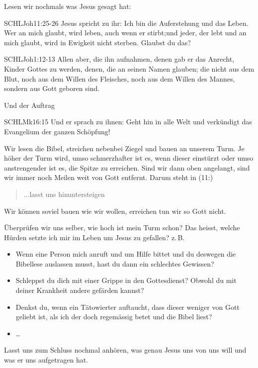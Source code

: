 \documentclass[14pt]{../../inc/mybib}
\newcommand{\q}[1]{\blockquote{#1}}
\newenvironment{block}[1][]{%
  \vspace{1.5em}%
  \noindent\textbf{#1}\par%
  \vspace{0.0em}%
}{%
  \vspace{1em}%
}
\begin{document}
\begin{block}
    Lesen wir nochmals was Jesus gesagt hat:
    \begin{bibelbox}{SCHL}{Joh}{11:25-26}
        Jesus spricht zu ihr: Ich bin die Auferstehung und das Leben. Wer an mich glaubt, wird leben, auch wenn er stirbt;und jeder, der lebt und an mich glaubt, wird in Ewigkeit nicht sterben. Glaubst du das?
    \end{bibelbox} 
    \begin{bibelbox}{SCHL}{Joh}{1:12-13}
        Allen aber, die ihn aufnahmen, denen gab er das Anrecht, Kinder Gottes zu werden, denen, die an seinen Namen glauben;
        die nicht aus dem Blut, noch aus dem Willen des Fleisches, noch aus dem Willen des Mannes, sondern aus Gott geboren sind.
    \end{bibelbox}     
    Und der Auftrag
    \begin{bibelbox}{SCHL}{Mk}{16:15}
        Und er sprach zu ihnen: Geht hin in alle Welt und verkündigt das Evangelium der ganzen Schöpfung!
    \end{bibelbox} 
    Wir lesen die Bibel, streichen nebenbei Ziegel und bauen an unserem Turm. Je höher der Turm wird, umso schmerzhafter ist es, wenn dieser einstürzt oder umso anstrengender ist es, die Spitze zu erreichen. Sind wir dann oben angelangt, sind wir immer noch Meilen weit von Gott entfernt. Darum steht in (11:) \q{...lasst uns hinuntersteigen}. Wir können soviel bauen wie wir wollen, erreichen tun wir so Gott nicht.

    Überprüfen wir uns selber, wie hoch ist mein Turm schon? Das heisst, welche Hürden setzte ich mir im Leben um Jesus zu gefallen? z.\,B. 
    \begin{itemize}
        \item Wenn eine Person mich anruft und um Hilfe bittet und du deswegen die Bibellese auslassen musst, hast du dann ein schlechtes Gewissen?
        \item Schleppst du dich mit einer Grippe in den Gottesdienst? Obwohl du mit deiner Krankheit andere gefärden kannst?
        \item Denkst du, wenn ein Tätowierter auftaucht, dass dieser weniger von Gott geliebt ist, als ich der doch regemässig betet und die Bibel liest?
        \item \dots
    \end{itemize}
            
\end{block}
    Lasst uns zum Schluss nochmal anhören, was genau Jesus uns von uns will und was er uns aufgetragen hat. 
\end{document}
